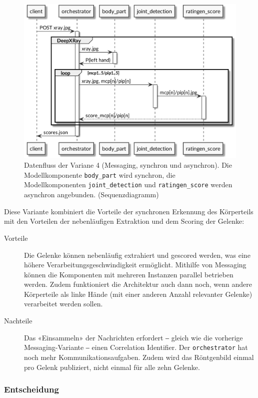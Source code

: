 \begin{figure}[tbh]
    \centering
    \includegraphics[width=\linewidth]{pics/datenfluss-variante-queue-2.png}
    \caption{Datenfluss der Variane 4 (Messaging, synchron und asynchron). Die Modellkomponente \texttt{body\_part} wird synchron, die Modellkomponenten \texttt{joint\_detection} und \texttt{ratingen\_score} werden asynchron angebunden. (Sequenzdiagramm)}
    \label{fig:datenfluss-variante-queue-2}
\end{figure}

Diese Variante kombiniert die Vorteile der synchronen Erkennung des Körperteils mit den Vorteilen der nebenläufigen Extraktion und dem Scoring der Gelenke:

\begin{description}
    \item[Vorteile] Die Gelenke können nebenläufig extrahiert und gescored werden, was eine höhere Verarbeitungsgeschwindigkeit ermöglicht. Mithilfe von Messaging können die Komponenten mit mehreren Instanzen parallel betrieben werden. Zudem funktioniert die Architektur auch dann noch, wenn andere Körperteile als linke Hände (mit einer anderen Anzahl relevanter Gelenke) verarbeitet werden sollen.
    \item[Nachteile] Das «Einsammeln» der Nachrichten erfordert ‒ gleich wie die vorherige Mes\-sag\-ing-Variante ‒ einen Correlation Identifier. Der \texttt{orchestrator} hat noch mehr Kommunikationsaufgaben. Zudem wird das Röntgenbild einmal pro Gelenk publiziert, nicht einmal für alle zehn Gelenke.
\end{description}

\subsubsection{Entscheidung}

